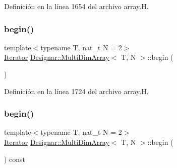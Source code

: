 Definición en la línea 1654 del archivo array.\+H.

\mbox{\label{class_designar_1_1_multi_dim_array_adaed0d8dcdb5500e751f27418e914c4d}} 
\subsubsection{\texorpdfstring{begin()}{begin()}\hspace{0.1cm}{\footnotesize\ttfamily [1/2]}}
{\footnotesize\ttfamily template$<$typename T, nat\+\_\+t N = 2$>$ \\
\hyperlink{class_designar_1_1_multi_dim_array_1_1_iterator}{Iterator} \hyperlink{class_designar_1_1_multi_dim_array}{Designar\+::\+Multi\+Dim\+Array}$<$ T, N $>$\+::begin (\begin{DoxyParamCaption}{ }\end{DoxyParamCaption})\hspace{0.3cm}{\ttfamily [inline]}}



Definición en la línea 1724 del archivo array.\+H.

\mbox{\label{class_designar_1_1_multi_dim_array_ad3760c3ce200ee63585ab7c7841b433d}} 
\subsubsection{\texorpdfstring{begin()}{begin()}\hspace{0.1cm}{\footnotesize\ttfamily [2/2]}}
{\footnotesize\ttfamily template$<$typename T, nat\+\_\+t N = 2$>$ \\
\hyperlink{class_designar_1_1_multi_dim_array_1_1_iterator}{Iterator} \hyperlink{class_designar_1_1_multi_dim_array}{Designar\+::\+Multi\+Dim\+Array}$<$ T, N $>$\+::begin (\begin{DoxyParamCaption}{ }\end{DoxyParamCaption}) const\hspace{0.3cm}{\ttfamily [inline]}}



